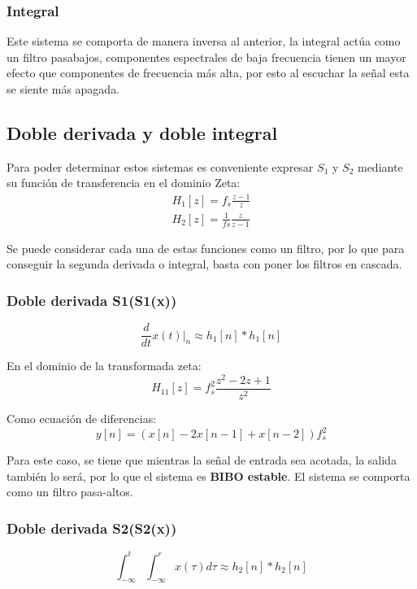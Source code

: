 		\subsubsection{Integral}
			Este sistema se comporta de manera inversa al anterior, la integral actúa como un filtro pasabajos, componentes espectrales de baja frecuencia tienen un mayor efecto que componentes de frecuencia más alta, por esto al escuchar la señal esta se siente más apagada. 

	\subsection{Doble derivada y doble integral}
			Para poder determinar estos sistemas es conveniente expresar $S_{1}$ y $S_{2}$ mediante su función de transferencia en el dominio Zeta:
			\begin{align}
				H_{1}[z] = f_{s}\frac{z-1}{z} \\
				H_{2}[z] = \frac{1}{fs} \frac{z}{z-1} 
			\end{align}
			
			Se puede considerar cada una de estas funciones como un filtro, por lo que para conseguir la segunda derivada o integral, basta con poner los filtros en cascada.
			\subsubsection{Doble derivada S1(S1(x))}
				\begin{equation}
					\frac{d}{dt}x(t)|_{n} \approx h_{1}[n] * h_{1}[n]
				\end{equation}
				
				En el dominio de la transformada zeta:
				\begin{equation}
					H_{11}[z] = f_{s}^{2} \frac{z^{2} -2z + 1}{z^{2}}
				\end{equation}
				
				Como ecuación de diferencias:
				\begin{equation}
					y[n] = \left( x[n] - 2x[n-1] + x[n-2] \right) f_{s}^{2}
				\end{equation}
				
				Para este caso,  se tiene que mientras la señal de entrada sea acotada, la salida también lo será, por lo que el sistema es \textbf{BIBO estable}. El sistema se comporta como un filtro pasa-altos.
				
			\subsubsection{Doble derivada S2(S2(x))}
				\begin{equation}
					\int_{-\infty}^{t}\int_{-\infty}^{r}x(\tau)d\tau \approx h_{2}[n] * h_{2}[n]
				\end{equation}
				
